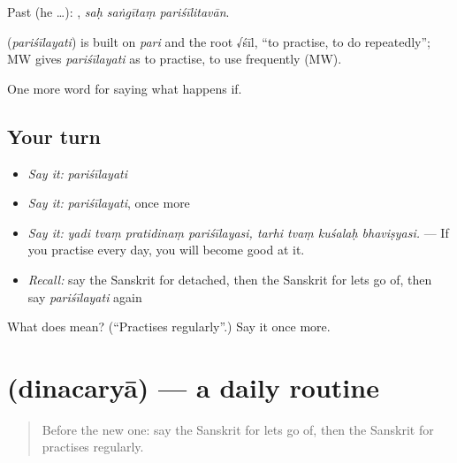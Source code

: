 Past (he …):   , \emph{saḥ saṅgītaṃ pariśīlitavān}.

\begin{cousinweb}
\textbf{} (\emph{pariśīlayati}) is built on \emph{pari} and the root √śīl, \textquotedblleft{}to practise, to do repeatedly\textquotedblright{}; MW gives \emph{pariśīlayati} as to practise, to use frequently (MW).
\end{cousinweb}

\begin{grammarlens}[title={What you've built}]
One more word for saying what happens if.
\end{grammarlens}

\subsection*{Your turn}
\begin{itemize}
\raggedright
  \item \emph{Say it:} \emph{pariśīlayati}
  \item \emph{Say it:} \emph{pariśīlayati}, once more
  \item \emph{Say it:} \emph{yadi tvaṃ pratidinaṃ pariśīlayasi, tarhi tvaṃ kuśalaḥ bhaviṣyasi.} — If you practise every day, you will become good at it.
  \item \emph{Recall:} say the Sanskrit for detached, then the Sanskrit for lets go of, then say \emph{pariśīlayati} again
\end{itemize}

\begin{tcolorbox}[breakable,colback=teal!4,colframe=teal!35!black,title={Before you move on}]
What does  mean? (\textquotedblleft{}Practises regularly\textquotedblright{}.) Say it once more.
\end{tcolorbox}
\section[\texorpdfstring{\sk{दिनचर्या} (dinacaryā)}{दिनचर्या (dinacaryā)}]{ (dinacaryā) — a daily routine}

\label{lesson:SA-C552-dinacarya}



\begin{quote}
Before the new one: say the Sanskrit for lets go of, then the Sanskrit for practises regularly.
\end{quote}

